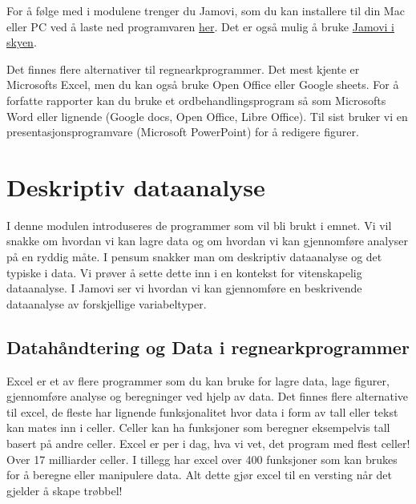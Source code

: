 \documentclass[
  letterpaper,
  DIV=11,
  numbers=noendperiod,
  oneside]{scrreprt}
\begin{document}
For å følge med i modulene trenger du Jamovi, som du kan installere til
din Mac eller PC ved å laste ned programvaren
\href{www.jamovi.org}{her}. Det er også mulig å bruke
\href{www.jamovi.org}{Jamovi i skyen}.

Det finnes flere alternativer til regnearkprogrammer. Det mest kjente er
Microsofts Excel, men du kan også bruke Open Office eller Google sheets.
For å forfatte rapporter kan du bruke et ordbehandlingsprogram så som
Microsofts Word eller lignende (Google docs, Open Office, Libre Office).
Til sist bruker vi en presentasjonsprogramvare (Microsoft PowerPoint)
for å redigere figurer.

\part{Deskriptiv dataanalyse}

I denne modulen introduseres de programmer som vil bli brukt i emnet. Vi
vil snakke om hvordan vi kan lagre data og om hvordan vi kan gjennomføre
analyser på en ryddig måte. I pensum snakker man om deskriptiv
dataanalyse og det typiske i data. Vi prøver å sette dette inn i en
kontekst for vitenskapelig dataanalyse. I Jamovi ser vi hvordan vi kan
gjennomføre en beskrivende dataanalyse av forskjellige variabeltyper.

\hypertarget{datahuxe5ndtering-og-data-i-regnearkprogrammer}{%
\chapter{Datahåndtering og Data i
regnearkprogrammer}\label{datahuxe5ndtering-og-data-i-regnearkprogrammer}}

Excel er et av flere programmer som du kan bruke for lagre data, lage
figurer, gjennomføre analyse og beregninger ved hjelp av data. Det
finnes flere alternative til excel, de fleste har lignende
funksjonalitet hvor data i form av tall eller tekst kan mates inn i
celler. Celler kan ha funksjoner som beregner eksempelvis tall basert på
andre celler. Excel er per i dag, hva vi vet, det program med flest
celler! Over 17 milliarder celler. I tillegg har excel over 400
funksjoner som kan brukes for å beregne eller manipulere data. Alt dette
gjør excel til en versting når det gjelder å skape trøbbel!

\end{document}

